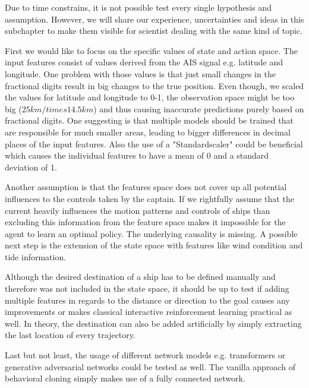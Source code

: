 Due to time constrains, it is not possible test every single hypothesis and assumption. However, we will share our experience, uncertainties and ideas in this subchapter to make them visible for scientist dealing with the same kind of topic.
\par
First we would like to focus on the specific values of state and action space. The input features consist of values derived from the AIS signal e.g. latitude and longitude. One problem with those values is that just small changes in the fractional digits result in big changes to the true position. Even though, we scaled the values for latitude and longitude to 0-1, the observation space might be too big ($25km /times 14.5km$) and thus causing inaccurate predictions purely based on fractional digits. One suggesting is that multiple models should be trained that are responsible for much smaller areas, leading to bigger differences in decimal places of the input features. Also the use of a "Standardscaler" could be beneficial which causes the individual features to have a mean of 0 and a standard deviation of 1.
\par
Another assumption is that the features space does not cover up all potential influences to the controls taken by the captain. If we rightfully assume that the current heavily influences the motion patterns and controls of ships than excluding this information from the feature space makes it impossible for the agent to learn an optimal policy. The underlying causality is missing. A possible next step is the extension of the state space with features like wind condition and tide information.
\par
Although the desired destination of a ship has to be defined manually and therefore was not included in the state space, it should be up to test if adding multiple features in regards to the distance or direction to the goal causes any improvements or makes classical interactive reinforcement learning practical as well. In theory, the destination can also be added artificially by simply extracting the last location of every trajectory.
\par
Last but not least, the usage of different network models e.g. transformers or generative adversarial networks could be tested as well. The vanilla approach of behavioral cloning simply makes use of a fully connected network.
